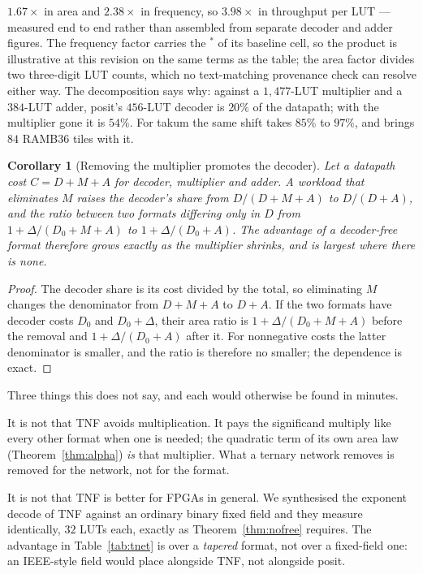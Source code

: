 \documentclass[11pt]{article}
\newtheorem{corollary}{Corollary}
\theoremstyle{definition}
\begin{document}
$1.67\times$ in area and $2.38\times$ in frequency, so $3.98\times$ in throughput
per LUT --- measured end to end rather than assembled from separate decoder and
adder figures. The frequency factor carries the $^{\ast}$ of its baseline cell, so
the product is illustrative at this revision on the same terms as the table; the
area factor divides two three-digit LUT counts, which no text-matching provenance
check can resolve either way. The decomposition says why: against a $1{,}477$-LUT multiplier and
a $384$-LUT adder, posit's $456$-LUT decoder is $20\%$ of the datapath; with the
multiplier gone it is $54\%$. For takum the same shift takes $85\%$ to $97\%$, and
brings $84$ RAMB36 tiles with it.

\begin{corollary}[Removing the multiplier promotes the decoder]
\label{cor:promote}
Let a datapath cost $C = D + M + A$ for decoder, multiplier and adder. A workload
that eliminates $M$ raises the decoder's share from $D/(D{+}M{+}A)$ to
$D/(D{+}A)$, and the ratio between two formats differing only in $D$ from
$1 + \Delta/(D_0{+}M{+}A)$ to $1 + \Delta/(D_0{+}A)$. The advantage of a
decoder-free format therefore grows exactly as the multiplier shrinks, and is
largest where there is none.
\end{corollary}
\begin{proof}
The decoder share is its cost divided by the total, so eliminating $M$ changes
the denominator from $D+M+A$ to $D+A$.  If the two formats have decoder costs
$D_0$ and $D_0+\Delta$, their area ratio is
$1+\Delta/(D_0+M+A)$ before the removal and
$1+\Delta/(D_0+A)$ after it.  For nonnegative costs the latter denominator is
smaller, and the ratio is therefore no smaller; the dependence is exact.
\end{proof}

Three things this does not say, and each would otherwise be found in minutes.

It is not that TNF avoids multiplication. It pays the significand multiply like
every other format when one is needed; the quadratic term of its own area law
(Theorem~\ref{thm:alpha}) \emph{is} that multiplier. What a ternary network removes
is removed for the network, not for the format.

It is not that TNF is better for FPGAs in general. We synthesised the exponent
decode of TNF against an ordinary binary fixed field and they measure identically,
$32$ LUTs each, exactly as Theorem~\ref{thm:nofree} requires. The advantage in
Table~\ref{tab:tnet} is over a \emph{tapered} format, not over a fixed-field one:
an IEEE-style field would place alongside TNF, not alongside posit.
\end{document}
